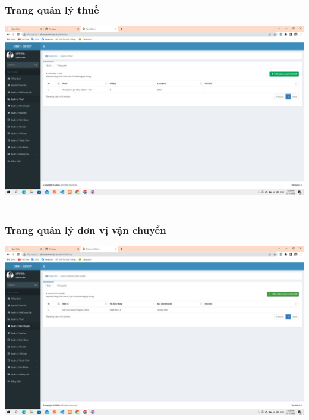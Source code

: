 \documentclass[12pt,a4paper,2sides]{report}
\begin{document}
\subsubsection{Trang quản lý thuế}
    \includegraphics[width=1\linewidth]{lib/results/quanlythue.jpg}\\\vspace*{1cm}
    \hspace{5cm}{Hình 45. Trang quản lý thuế}\\
\subsubsection{Trang quản lý đơn vị vận chuyển}
    \includegraphics[width=1\linewidth]{lib/results/quanlydvvc.jpg}\\\vspace*{1cm} 
    \hspace{4cm}{Hình 46. Trang quản lý đơn vị vận chuyển}\\
\end{document}
